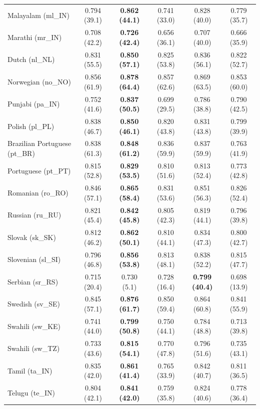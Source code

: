 \begin{longtable}{@{}lccccc@{}}
    Malayalam (ml\_IN) & 0.794 (39.1) & \textbf{0.862 (44.1)} & 0.741 (33.0) & 0.828 (40.0) & 0.779 (35.7) \\
    Marathi (mr\_IN) & 0.708 (42.2) & \textbf{0.726 (42.4)} & 0.656 (36.1) & 0.707 (40.0) & 0.666 (35.9) \\
    Dutch (nl\_NL) & 0.831 (55.5) & \textbf{0.850 (57.1)} & 0.825 (53.8) & 0.836 (56.1) & 0.822 (52.7) \\
    Norwegian (no\_NO) & 0.856 (61.9) & \textbf{0.878 (64.4)} & 0.857 (62.6) & 0.869 (63.5) & 0.853 (60.0) \\
    Punjabi (pa\_IN) & 0.752 (41.6) & \textbf{0.837 (50.5)} & 0.699 (29.5) & 0.786 (38.8) & 0.790 (42.5) \\
    Polish (pl\_PL) & 0.838 (46.7) & \textbf{0.850 (46.1)} & 0.820 (43.8) & 0.831 (43.8) & 0.799 (39.9) \\
    Brazilian Portuguese (pt\_BR) & 0.838 (61.3) & \textbf{0.848 (61.2)} & 0.836 (59.9) & 0.837 (59.9) & 0.763 (41.9) \\
    Portuguese (pt\_PT) & 0.815 (52.8) & \textbf{0.829 (53.5)} & 0.810 (51.6) & 0.813 (52.4) & 0.773 (42.8) \\
    Romanian (ro\_RO) & 0.846 (57.1) & \textbf{0.865 (58.4)} & 0.831 (53.6) & 0.851 (56.3) & 0.826 (52.4) \\
    Russian (ru\_RU) & 0.821 (45.4) & \textbf{0.842 (45.8)} & 0.805 (42.3) & 0.819 (44.1) & 0.796 (39.8) \\
    Slovak (sk\_SK) & 0.812 (46.2) & \textbf{0.862 (50.1)} & 0.810 (44.1) & 0.834 (47.3) & 0.800 (42.7) \\
    Slovenian (sl\_SI) & 0.796 (46.8) & \textbf{0.856 (53.8)} & 0.813 (48.1) & 0.838 (52.2) & 0.815 (47.7) \\
    Serbian (sr\_RS) & 0.715 (20.4) & 0.730 (5.1) & 0.728 (16.4) & \textbf{0.799 (40.4)} & 0.698 (13.9) \\
    Swedish (sv\_SE) & 0.845 (57.1) & \textbf{0.876 (61.7)} & 0.850 (59.4) & 0.864 (60.8) & 0.841 (55.9) \\
    Swahili (sw\_KE) & 0.741 (44.0) & \textbf{0.799 (50.8)} & 0.750 (44.1) & 0.784 (48.8) & 0.713 (39.8) \\
    Swahili (sw\_TZ) & 0.733 (43.6) & \textbf{0.815 (54.1)} & 0.770 (47.8) & 0.796 (51.6) & 0.735 (43.1) \\
    Tamil (ta\_IN) & 0.835 (42.0) & \textbf{0.861 (41.4)} & 0.765 (33.9) & 0.842 (40.7) & 0.811 (36.5) \\
    Telugu (te\_IN) & 0.804 (42.1) & \textbf{0.841 (42.0)} & 0.759 (35.8) & 0.824 (40.6) & 0.778 (36.4) \\

\end{longtable}
